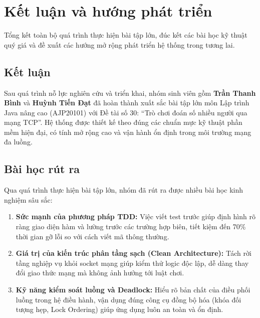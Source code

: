 \chapter{Kết luận và hướng phát triển}
\label{ch:ketluan}

\begin{muctieu}
Tổng kết toàn bộ quá trình thực hiện bài tập lớn, đúc kết các bài học kỹ thuật
quý giá và đề xuất các hướng mở rộng phát triển hệ thống trong tương lai.
\end{muctieu}

\section{Kết luận}

Sau quá trình nỗ lực nghiên cứu và triển khai, nhóm sinh viên gồm \textbf{Trần
Thanh Bình} và \textbf{Huỳnh Tiến Đạt} đã hoàn thành xuất sắc bài tập lớn môn
Lập trình Java nâng cao (AJP20101) với Đề tài số 30: ``Trò chơi đoán số nhiều
người qua mạng TCP''. Hệ thống được thiết kế theo đúng các chuẩn mực kỹ thuật
phần mềm hiện đại, có tính mở rộng cao và vận hành ổn định trong môi trường
mạng đa luồng.

\section{Bài học rút ra}

Qua quá trình thực hiện bài tập lớn, nhóm đã rút ra được nhiều bài học kinh
nghiệm sâu sắc:
\begin{enumerate}[leftmargin=1.6em, itemsep=2pt]
  \item \textbf{Sức mạnh của phương pháp TDD:} Việc viết test trước giúp định
        hình rõ ràng giao diện hàm và lường trước các trường hợp biên, tiết
        kiệm đến 70\% thời gian gỡ lỗi so với cách viết mã thông thường.
  \item \textbf{Giá trị của kiến trúc phân tầng sạch (Clean Architecture):}
        Tách rời tầng nghiệp vụ khỏi socket mạng giúp kiểm thử logic độc lập,
        dễ dàng thay đổi giao thức mạng mà không ảnh hưởng tới luật chơi.
  \item \textbf{Kỹ năng kiểm soát luồng và Deadlock:} Hiểu rõ bản chất của
        điều phối luồng trong hệ điều hành, vận dụng đúng công cụ đồng bộ hóa
        (khóa đối tượng hẹp, Lock Ordering) giúp ứng dụng luôn an toàn và ổn
        định.
\end{enumerate}

